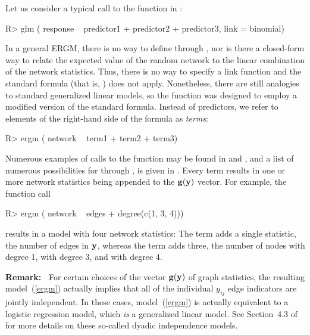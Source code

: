 \documentclass[nojss]{jss}
\def\vec#1{\mathchoice{\mbox{\boldmath$\displaystyle\bf#1$}}
{\mbox{\boldmath$\textstyle\bf#1$}}
{\mbox{\boldmath$\scriptstyle\bf#1$}}
{\mbox{\boldmath$\scriptscriptstyle\bf#1$}}}
\begin{document}
Let us consider a typical call to the  function in :
\begin{CodeChunk}
\begin{CodeInput}
R> glm ( response ~ predictor1 + predictor2 + predictor3, link = binomial)
\end{CodeInput}
\end{CodeChunk}
In a general ERGM, there
is no way to define  through ,
nor is there a closed-form way to relate the expected value of the random
network to the linear combination of the network statistics.  Thus, there is
no way to specify a link function and the standard  formula
(that is, ) does not apply.  Nonetheless, there
are still analogies to standard generalized linear models, so the
 function was designed to employ a modified version of the
standard  formula.  Instead of predictors, we refer to elements of
the right-hand side of the formula as {\em terms}:
\begin{CodeChunk}
\begin{CodeInput}
R> ergm ( network ~ term1 + term2 + term3)
\end{CodeInput}
\end{CodeChunk}
Numerous examples of calls to the  function may be found in
\citet{ergmjss} and \citet{statnettutorialjss}, and a list of numerous possibilities
for  through , is given in \citet{ergmtermsjss}.
Every term results in one or more network statistics being appended to the 
$\vec g(\vec y)$ vector.  For example, the function call
\begin{CodeChunk}
\begin{CodeInput}
R> ergm ( network ~ edges + degree(c(1, 3, 4)))
\end{CodeInput}
\end{CodeChunk}
results in a model with four network statistics:
The  term adds
a single statistic, the number of edges in $\vec y$, whereas the  term
adds three, the number of nodes with degree 1, with degree 3, and with degree 4.

{\bf Remark:\ }
For certain choices of the vector $\vec g(\vec y)$ of graph statistics, the resulting
model~(\ref{ergm}) actually implies that all of the individual $y_{ij}$ edge indicators
are jointly independent.  In these cases, model~(\ref{ergm}) is actually equivalent
to a logistic regression model, which {\em is} a generalized linear model.
See Section~4.3 of \cite{ergmjss} for more details on these so-called
dyadic independence models.
\end{document}
